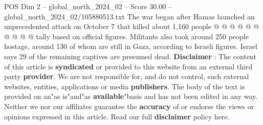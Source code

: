 \begin{textsample}{POS Dim 2 – global\_north\_2024\_02 – Score 30.00 – global\_north\_2024\_02/105880513.txt}
The war began after Hamas launched an unprecedented attack on October 7 that killed about 1,160 people @ @ @ @ @ @ @ @ @ @ tally based on official figures.
Militants also took around 250 people hostage, around 130 of whom are still in Gaza, according to Israeli figures.
Israel says 29 of the remaining captives are presumed dead. \textbf{Disclaimer} : The content of this article is \textbf{syndicated} or provided to this website from an external third party \textbf{provider}.
We are not responsible for, and do not control, such external websites, entities, applications or media \textbf{publishers}.
The body of the text is provided on an"as is"and"as \textbf{available}"basis and has not been edited in any way.
Neither we nor our affiliates guarantee the \textbf{accuracy} of or endorse the views or opinions expressed in this article.
Read our full \textbf{disclaimer} policy here.

\end{textsample}
